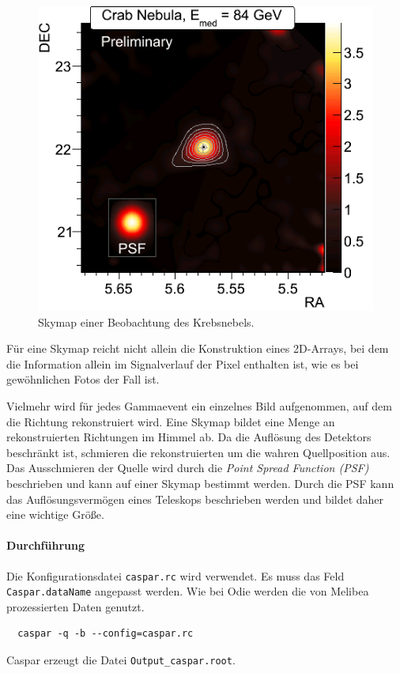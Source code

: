 \begin{figure}
  \centering
  \includegraphics[width=\linewidth]{pictures/skymap.png}
  \caption{Skymap einer Beobachtung des Krebsnebels.}%
  \label{fig:skymap}
\end{figure}

Für eine Skymap reicht nicht allein die Konstruktion eines 2D-Arrays,
bei dem die Information allein im Signalverlauf der Pixel enthalten ist,
wie es bei gewöhnlichen Fotos der Fall ist.

Vielmehr wird für jedes Gammaevent ein einzelnes Bild aufgenommen,
auf dem die Richtung rekonstruiert wird.
Eine Skymap bildet eine Menge an rekonstruierten Richtungen im Himmel ab.
Da die Auflösung des Detektors beschränkt ist,
schmieren die rekonstruierten um die wahren Quellposition aus.
Das Ausschmieren der Quelle wird durch die \textit{Point Spread Function (PSF)}
beschrieben
und kann auf einer Skymap bestimmt werden.
Durch die PSF kann das Auflösungsvermögen eines Teleskops
beschrieben werden und bildet daher eine wichtige Größe.

\paragraph{Durchführung}%

Die Konfigurationsdatei \texttt{caspar.rc} wird verwendet.
Es muss das Feld \texttt{Caspar.dataName} angepasst werden.
Wie bei Odie werden die von Melibea prozessierten Daten genutzt.

\begin{lstlisting}
  caspar -q -b --config=caspar.rc
\end{lstlisting}

Caspar erzeugt die Datei \texttt{Output\_caspar.root}.
